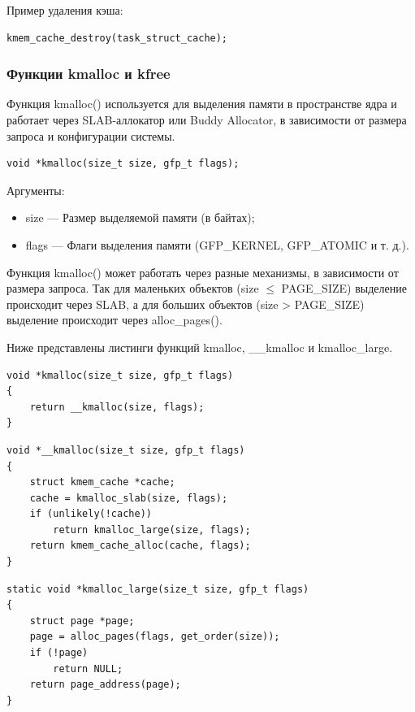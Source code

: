 Пример удаления кэша:

\begin{lstlisting}
kmem_cache_destroy(task_struct_cache);
\end{lstlisting}

\subsubsection{Функции kmalloc и kfree}

Функция kmalloc() используется для выделения памяти в пространстве ядра и работает через SLAB-аллокатор или Buddy Allocator, в зависимости от размера запроса и конфигурации системы.

\begin{lstlisting}
void *kmalloc(size_t size, gfp_t flags);
\end{lstlisting}

Аргументы:
\begin{itemize}
    \item size --- Размер выделяемой памяти (в байтах);
    \item flags --- Флаги выделения памяти (GFP\_KERNEL, GFP\_ATOMIC и т. д.).
\end{itemize}

Функция kmalloc() может работать через разные механизмы, в зависимости от размера запроса.
Так для маленьких объектов (size $\leq$ PAGE\_SIZE) выделение происходит через SLAB, а для больших объектов (size > PAGE\_SIZE) выделение происходит через alloc\_pages().

Ниже представлены листинги функций kmalloc, \_\_kmalloc и kmalloc\_large.

\begin{lstlisting}[caption={kmalloc}]
void *kmalloc(size_t size, gfp_t flags)
{
    return __kmalloc(size, flags);
}
\end{lstlisting}

\begin{lstlisting}[caption={\_\_kmalloc}]
void *__kmalloc(size_t size, gfp_t flags)
{
    struct kmem_cache *cache;
    cache = kmalloc_slab(size, flags);
    if (unlikely(!cache))
        return kmalloc_large(size, flags);
    return kmem_cache_alloc(cache, flags);
}
\end{lstlisting}

\begin{lstlisting}[caption={kmalloc\_large}]
static void *kmalloc_large(size_t size, gfp_t flags)
{
    struct page *page;
    page = alloc_pages(flags, get_order(size));
    if (!page)
        return NULL;
    return page_address(page);
}
\end{lstlisting}

